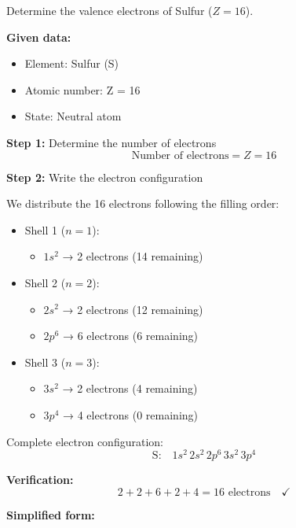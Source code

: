\begin{exercise}
    Determine the valence electrons of Sulfur (\( Z = 16 \)).
    \begin{solu}
        \textbf{Given data:}
        \begin{itemize}
            \item Element: Sulfur (S)
            \item Atomic number: Z = 16
            \item State: Neutral atom
        \end{itemize}

        \textbf{Step 1:} Determine the number of electrons
        \[
            \text{Number of electrons} = Z = 16
        \]

        \textbf{Step 2:} Write the electron configuration

        We distribute the 16 electrons following the filling order:
        \begin{itemize}
            \item Shell 1 (\(n = 1\)):
            \begin{itemize}
                \item \(1s^2\) → 2 electrons (14 remaining)
            \end{itemize}
            \item Shell 2 (\(n = 2\)):
            \begin{itemize}
                \item \(2s^2\) → 2 electrons (12 remaining)
                \item \(2p^6\) → 6 electrons (6 remaining)
            \end{itemize}
            \item Shell 3 (\(n = 3\)):
            \begin{itemize}
                \item \(3s^2\) → 2 electrons (4 remaining)
                \item \(3p^4\) → 4 electrons (0 remaining)
            \end{itemize}
        \end{itemize}

        Complete electron configuration:
        \[
            \text{S:} \quad 1s^2 \, 2s^2 \, 2p^6 \, 3s^2 \, 3p^4
        \]

        \textbf{Verification:}
        \[
            2 + 2 + 6 + 2 + 4 = 16 \text{ electrons} \quad \checkmark
        \]

        \textbf{Simplified form:}


\end{solu}
\end{exercise}

